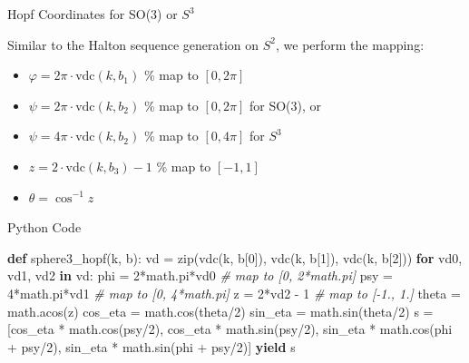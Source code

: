 \documentclass[10pt,ignorenonframetext,serif,onlymath]{beamer}
\newenvironment{Shaded}{}{}
\newcommand{\BuiltInTok}[1]{#1}
\newcommand{\CommentTok}[1]{\textcolor[rgb]{0.38,0.63,0.69}{\textit{#1}}}
\newcommand{\ControlFlowTok}[1]{\textcolor[rgb]{0.00,0.44,0.13}{\textbf{#1}}}
\newcommand{\DecValTok}[1]{\textcolor[rgb]{0.25,0.63,0.44}{#1}}
\newcommand{\KeywordTok}[1]{\textcolor[rgb]{0.00,0.44,0.13}{\textbf{#1}}}
\newcommand{\NormalTok}[1]{#1}
\newcommand{\OperatorTok}[1]{\textcolor[rgb]{0.40,0.40,0.40}{#1}}
\begin{document}
\begin{frame}{Hopf Coordinates for SO(3) or \(S^3\)}
\protect\hypertarget{hopf-coordinates-for-so3-or-s3}{}

Similar to the Halton sequence generation on \(S^2\), we perform the
mapping:

\begin{itemize}
\item
  \(\varphi = 2\pi\cdot\mathrm{vdc}(k,b_1)\) \% map to \([0,2\pi]\)
\item
  \(\psi = 2\pi\cdot\mathrm{vdc}(k,b_2)\) \% map to \([0,2\pi]\) for
  SO(3), or
\item
  \(\psi = 4\pi\cdot\mathrm{vdc}(k,b_2)\) \% map to \([0,4\pi]\) for
  \(S^3\)
\item
  \(z = 2\cdot\mathrm{vdc}(k,b_3) - 1\) \% map to \([-1,1]\)
\item
  \(\theta = \cos^{-1}z\)
\end{itemize}

\end{frame}

\begin{frame}[fragile]{Python Code}
\protect\hypertarget{python-code-1}{}

\begin{Shaded}
\begin{Highlighting}[]
\KeywordTok{def}\NormalTok{ sphere3_hopf(k, b):}
\NormalTok{    vd }\OperatorTok{=} \BuiltInTok{zip}\NormalTok{(vdc(k, b[}\DecValTok{0}\NormalTok{]), vdc(k, b[}\DecValTok{1}\NormalTok{]), vdc(k, b[}\DecValTok{2}\NormalTok{]))}
    \ControlFlowTok{for}\NormalTok{ vd0, vd1, vd2 }\KeywordTok{in}\NormalTok{ vd:}
\NormalTok{        phi }\OperatorTok{=} \DecValTok{2}\OperatorTok{*}\NormalTok{math.pi}\OperatorTok{*}\NormalTok{vd0   }\CommentTok{# map to [0, 2*math.pi]}
\NormalTok{        psy }\OperatorTok{=} \DecValTok{4}\OperatorTok{*}\NormalTok{math.pi}\OperatorTok{*}\NormalTok{vd1   }\CommentTok{# map to [0, 4*math.pi]}
\NormalTok{        z }\OperatorTok{=} \DecValTok{2}\OperatorTok{*}\NormalTok{vd2 }\OperatorTok{-} \DecValTok{1}         \CommentTok{# map to [-1., 1.]}
\NormalTok{        theta }\OperatorTok{=}\NormalTok{ math.acos(z)}
\NormalTok{        cos_eta }\OperatorTok{=}\NormalTok{ math.cos(theta}\OperatorTok{/}\DecValTok{2}\NormalTok{)}
\NormalTok{        sin_eta }\OperatorTok{=}\NormalTok{ math.sin(theta}\OperatorTok{/}\DecValTok{2}\NormalTok{)}
\NormalTok{        s }\OperatorTok{=}\NormalTok{ [cos_eta }\OperatorTok{*}\NormalTok{ math.cos(psy}\OperatorTok{/}\DecValTok{2}\NormalTok{),}
\NormalTok{             cos_eta }\OperatorTok{*}\NormalTok{ math.sin(psy}\OperatorTok{/}\DecValTok{2}\NormalTok{),}
\NormalTok{             sin_eta }\OperatorTok{*}\NormalTok{ math.cos(phi }\OperatorTok{+}\NormalTok{ psy}\OperatorTok{/}\DecValTok{2}\NormalTok{),}
\NormalTok{             sin_eta }\OperatorTok{*}\NormalTok{ math.sin(phi }\OperatorTok{+}\NormalTok{ psy}\OperatorTok{/}\DecValTok{2}\NormalTok{)]}
        \ControlFlowTok{yield}\NormalTok{ s}
\end{Highlighting}
\end{Shaded}

\end{frame}
\end{document}
